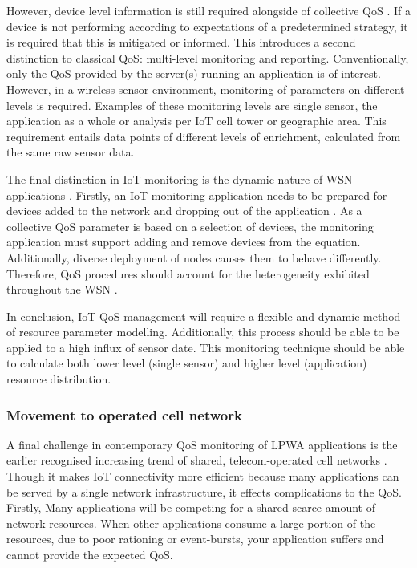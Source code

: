 However, device level information is still required alongside of collective QoS \cite{device_level}. If a device is not performing according to expectations of a predetermined strategy, it is required that this is mitigated or informed. This introduces a second distinction to classical QoS: multi-level monitoring and reporting. Conventionally, only the QoS provided by the server(s) running an application is of interest. However, in a wireless sensor environment, monitoring of parameters on different levels is required. Examples of these monitoring levels are single sensor, the application as a whole or analysis per IoT cell tower or geographic area. This requirement entails data points of different levels of enrichment, calculated from the same raw sensor data.

The final distinction in IoT monitoring is the dynamic nature of WSN applications \cite{popularity_applications_qos_moeilijk}. Firstly, an IoT monitoring application needs to be prepared for devices added to the network and dropping out of the application \cite{ontology}. As a collective QoS parameter is based on a selection of devices, the monitoring application must support adding and remove devices from the equation. Additionally, diverse deployment of nodes causes them to behave differently. Therefore, QoS procedures should account for the heterogeneity exhibited throughout the WSN \cite{energy_challenges}.

In conclusion, IoT QoS management will require a flexible and dynamic method of resource parameter modelling. Additionally, this process should be able to be applied to a high influx of sensor date. This monitoring technique should be able to calculate both lower level (single sensor) and higher level (application) resource distribution.

\subsubsection{Movement to operated cell network}
A final challenge in contemporary QoS monitoring of LPWA applications is the earlier recognised increasing trend of shared, telecom-operated cell networks \cite{tmobile, vodafone}. Though it makes IoT connectivity more efficient because many applications can be served by a single network infrastructure, it  effects complications to the QoS. Firstly, Many applications will be competing for a shared scarce amount of network resources. When other applications consume a large portion of the resources, due to poor rationing or event-bursts, your application suffers and cannot provide the expected QoS.

